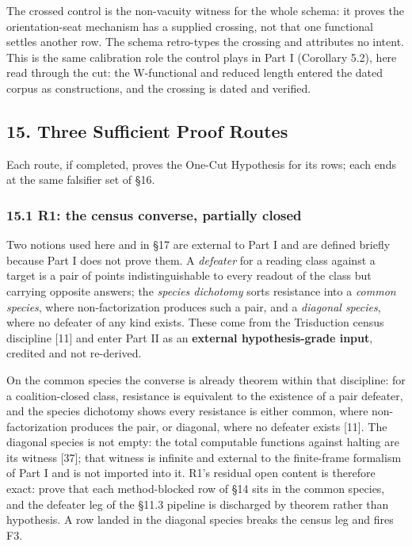 \documentclass[10pt,twocolumn]{article}
\begin{document}
The crossed control is the non-vacuity witness for the whole schema: it
proves the orientation-seat mechanism has a supplied crossing, not that
one functional settles another row. The schema retro-types the crossing
and attributes no intent. This is the same calibration role the control
plays in Part I (Corollary 5.2), here read through the cut: the
W-functional and reduced length entered the dated corpus as
constructions, and the crossing is dated and verified.

\subsection{15. Three Sufficient Proof
Routes}\label{three-sufficient-proof-routes}

Each route, if completed, proves the One-Cut Hypothesis for its rows;
each ends at the same falsifier set of §16.

\subsubsection{15.1 R1: the census converse, partially
closed}\label{r1-the-census-converse-partially-closed}

Two notions used here and in §17 are external to Part I and are defined
briefly because Part I does not prove them. A \emph{defeater} for a
reading class against a target is a pair of points indistinguishable to
every readout of the class but carrying opposite answers; the
\emph{species dichotomy} sorts resistance into a \emph{common species},
where non-factorization produces such a pair, and a \emph{diagonal
species}, where no defeater of any kind exists. These come from the
Trisduction census discipline {[}11{]} and enter Part II as an
\textbf{external hypothesis-grade input}, credited and not re-derived.

On the common species the converse is already theorem within that
discipline: for a coalition-closed class, resistance is equivalent to
the existence of a pair defeater, and the species dichotomy shows every
resistance is either common, where non-factorization produces the pair,
or diagonal, where no defeater exists {[}11{]}. The diagonal species is
not empty: the total computable functions against halting are its
witness {[}37{]}; that witness is infinite and external to the
finite-frame formalism of Part I and is not imported into it. R1's
residual open content is therefore exact: prove that each method-blocked
row of §14 sits in the common species, and the defeater leg of the §11.3
pipeline is discharged by theorem rather than hypothesis. A row landed
in the diagonal species breaks the census leg and fires F3.
\end{document}
